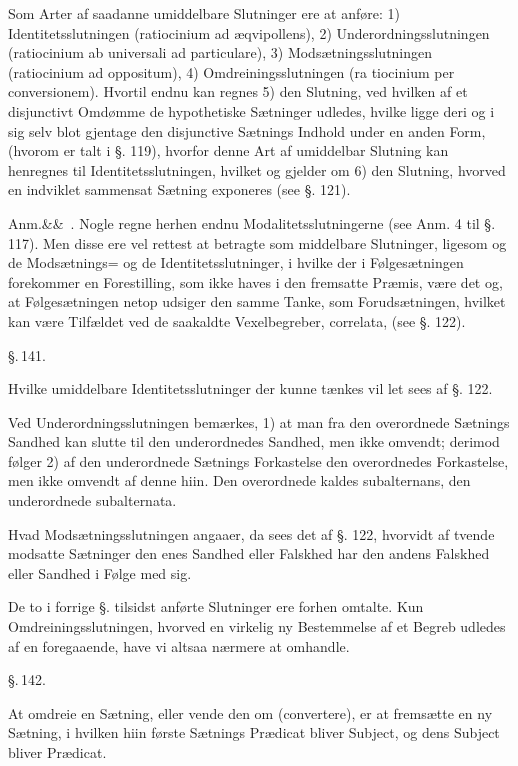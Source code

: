 \documentclass[12pt]{book}
\def\sperr#1{#1}%
\def\textit#1{#1}%
\def\emph#1{#1}%
\newcommand{\sperr}[1]{\textls[180]{#1}}
\newcommand{\parag}[1]{%
  \par\vspace{0.9\baselineskip}%
  {\centering\textit{\S.\,#1.}\par}%
  \vspace{0.35\baselineskip}%
  \noindent\hspace{\parindent}\ignorespaces
}
\newcommand{\anm}[1]{%
  \par\vspace{0.5\baselineskip}%
  \noindent\hspace{\parindent}\sperr{Anm.}\ifx&#1&\else~\textit{#1}.\fi
  \enspace\ignorespaces
}
\newcommand{\opage}[1]{\marginnote{\footnotesize\textit{[#1]}}}
\begin{document}
Som Arter af saadanne umiddelbare Slutninger ere at anføre: 1)
\emph{Identitetsslutningen} (\textit{ratiocinium ad æqvipollens}), 2)
\emph{Underordningsslutningen} (\textit{ratiocinium ab universali ad
particulare}), 3) \emph{Modsætningsslutningen} (\textit{ratiocinium ad
oppositum}), 4) \emph{Omdreiningsslutningen} (\textit{ra%
\opage{330}tiocinium per conversionem}). Hvortil endnu kan regnes 5) den Slutning, ved
hvilken af et disjunctivt Omdømme de hypothetiske Sætninger udledes, hvilke
ligge deri og i sig selv blot gjentage den disjunctive Sætnings Indhold under en
anden Form, (hvorom er talt i §. 119), hvorfor denne Art af umiddelbar Slutning
kan henregnes til \emph{Identitetsslutningen}, hvilket og gjelder om 6) den
Slutning, hvorved en indviklet sammensat Sætning exponeres (see §. 121).

\anm{} Nogle regne herhen endnu \emph{Modalitetsslutningerne} (see Anm. 4 til
§. 117). Men disse ere vel rettest at betragte som middelbare Slutninger,
ligesom og de \emph{Modsætnings=} og de \emph{Identitetsslutninger}, i hvilke
der i Følgesætningen forekommer en Forestilling, som ikke haves i den fremsatte
Præmis, være det og, at Følgesætningen netop udsiger den samme Tanke, som
Forudsætningen, hvilket kan være Tilfældet ved de saakaldte
\emph{Vexelbegreber}, \textit{correlata}, (see §. 122).

\parag{141}

Hvilke umiddelbare \emph{Identitetsslutninger} der kunne tænkes vil let sees af
§. 122.

Ved \emph{Underordningsslutningen} bemærkes, 1) at man fra den overordnede
Sætnings Sandhed kan slutte til den underordnedes Sandhed, men ikke omvendt;
derimod følger 2) af den underordnede Sætnings Forkastelse den overordnedes
Forkastelse, men ikke omvendt af denne hiin.
\opage{331} Den overordnede kaldes \textit{subalternans}, den underordnede
\textit{subalternata}.

Hvad \emph{Modsætningsslutningen} angaaer, da sees det af §. 122, hvorvidt af
tvende modsatte Sætninger den enes Sandhed eller Falskhed har den andens
Falskhed eller Sandhed i Følge med sig.

De to i forrige §. tilsidst anførte Slutninger ere forhen omtalte. Kun
Omdreiningsslutningen, hvorved en virkelig ny Bestemmelse af et Begreb udledes
af en foregaaende, have vi altsaa nærmere at omhandle.

\parag{142}

At omdreie en Sætning, eller vende den om (\textit{convertere}), er at
fremsætte en ny Sætning, i hvilken hiin første Sætnings Prædicat bliver
Subject, og dens Subject bliver Prædicat.
\end{document}
